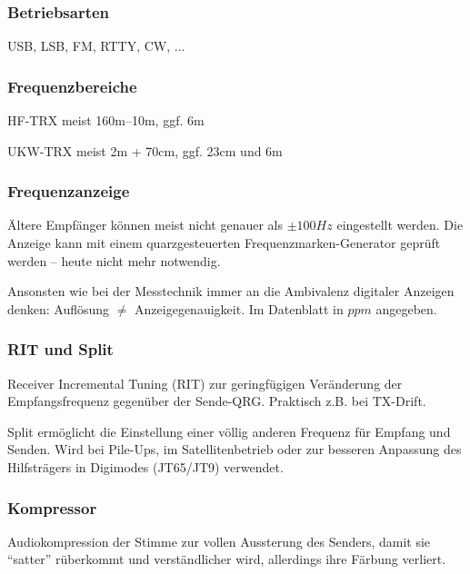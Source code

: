 \begin{frame}
    \frametitle{Betriebsarten}

    USB, LSB, FM, RTTY, CW, ...

\end{frame}

\begin{frame}
    \frametitle{Frequenzbereiche}

    HF-TRX meist 160m--10m, ggf. 6m

    \bigskip

    UKW-TRX meist 2m + 70cm, ggf. 23cm und 6m

\end{frame}

\begin{frame}
    \frametitle{Frequenzanzeige}

    Ältere Empfänger können meist nicht genauer als $\pm100Hz$ eingestellt
    werden.  Die Anzeige kann mit einem quarzgesteuerten
    Frequenzmarken-Generator geprüft werden -- heute nicht mehr notwendig.

    \bigskip

    Ansonsten wie bei der Messtechnik immer an die Ambivalenz digitaler Anzeigen
    denken: Auflösung $\neq$ Anzeigegenauigkeit. Im Datenblatt in $ppm$ angegeben.

\end{frame}

\begin{frame}
    \frametitle{RIT und Split}

    Receiver Incremental Tuning (RIT) zur geringfügigen Veränderung der
    Empfangsfrequenz gegenüber der Sende-QRG. Praktisch z.B. bei TX-Drift.

    \bigskip

    Split ermöglicht die Einstellung einer völlig anderen Frequenz für Empfang
    und Senden. Wird bei Pile-Ups, im Satellitenbetrieb oder zur besseren
    Anpassung des Hilfsträgers in Digimodes (JT65/JT9) verwendet.

\end{frame}

\begin{frame}
    \frametitle{Kompressor}

    Audiokompression der Stimme zur vollen Aussterung des Senders, damit sie
    ``satter'' rüberkommt und verständlicher wird, allerdings ihre Färbung
    verliert.

\end{frame}

